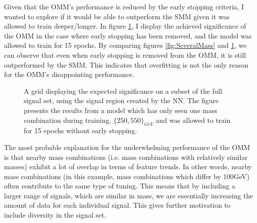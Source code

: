 Given that the \ac{OMM}'s performance is reduced by the early stopping criteria, I wanted to explore if it would be able to outperform the 
\ac{SMM} given it was allowed to train deeper/longer. In figure \ref{fig:NNOverfitting}, I display the achieved significance
of the \ac{OMM} in the case where early stopping has been removed, and the model was allowed to train for 15 epochs. By comparing figures 
\ref{fig:SeveralMass} and \ref{fig:NNOverfitting}, we can observe that even when early stopping is removed from the \ac{OMM}, it is  
still outperformed by the \ac{SMM}. This indicates that overfitting is not the only reason for the \ac{OMM}'s disappointing performance.\\
\begin{figure}[H]
    \centering
    \caption[A grid displaying the expected significance on a subset of the full signal set, using the signal region 
    created by a dense \acs{NN} which has trained on one mass, and has been allowed to train for 16 epochs.]{
    A grid displaying the expected significance on a subset of the full signal set, using the signal region 
    created by the \ac{NN}. The figure presents the results from a model which has only seen one mass combination 
    during training, $\{250,550\}_{GeV}$ and was allowed to train for 15 epochs without 
    early stopping. }
    \label{fig:NNOverfitting}
\end{figure}
The most probable explanation for the underwhelming performance of the \ac{OMM} is that nearby mass combinations (i.e. mass combinations with 
relatively similar masses) exhibit a lot of overlap in terms of feature trends. In other words, nearby mass combinations (in this example, mass combinations which 
differ by 100GeV) often contribute to the same type of tuning. This means that by including a larger range of signals, which are similar in mass, we are 
essentially increasing the amount of data for each individual signal. This gives further motivation to include diversity in the signal set.